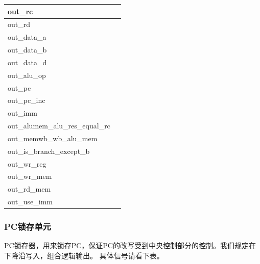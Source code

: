 \begin{center}
\begin{tabular}{|p{3.5cm}|p{11cm}|}
        \hline out\_rc &  \\
        \hline out\_rd &  \\
        \hline out\_data\_a &  \\
        \hline out\_data\_b &  \\
        \hline out\_data\_d &  \\
        \hline out\_alu\_op &  \\
        \hline out\_pc &  \\
        \hline out\_pc\_inc &  \\
        \hline out\_imm &  \\
        \hline out\_alumem\_alu\_res\_equal\_rc &  \\
        \hline out\_memwb\_wb\_alu\_mem &  \\
        \hline out\_is\_branch\_except\_b &  \\
        \hline out\_wr\_reg &  \\
        \hline out\_wr\_mem &  \\
        \hline out\_rd\_mem &  \\
        \hline out\_use\_imm &  \\
        \hline
    \end{tabular}

\end{center}




\subsubsection{PC锁存单元}
    PC锁存器，用来锁存PC，保证PC的改写受到中央控制部分的控制。我们规定在下降沿写入，组合逻辑输出。
    具体信号请看下表。